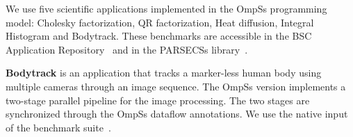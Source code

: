 We use five scientific applications implemented in the OmpSs programming model: Cholesky factorization, QR factorization, Heat diffusion, Integral Histogram and Bodytrack. These benchmarks are accessible in the BSC Application Repository~\cite{BAR} and in the PARSECSs library~\cite{Chasapis:TACO2016}. 


\textbf{Bodytrack} is an application that tracks a marker-less human body using multiple cameras through an image sequence. 
The OmpSs version implements a two-stage parallel pipeline for the image processing.
The two stages are synchronized through the OmpSs dataflow annotations.
We use the native input of the benchmark suite~\cite{Chasapis:TACO2016}.

